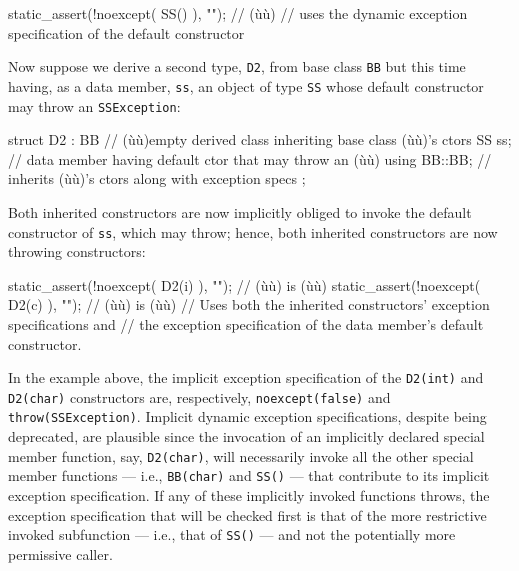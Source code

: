 \begin{emcppslisting}
static_assert(!noexcept( SS() ),  "");  // (ù{}ù)
    // uses the dynamic exception specification of the default constructor
\end{emcppslisting}
    

\noindent Now suppose we derive a second type, \lstinline!D2!, from base class
\lstinline!BB! but this time having, as a data member, \lstinline!ss!, an
object of type \lstinline!SS! whose default constructor may throw an
\lstinline!SSException!:

\begin{emcppslisting}
struct D2 : BB  // (ù{}ù)empty derived class inheriting base class (ù{}ù)'s ctors
{
    SS ss;         // data member having default ctor that may throw an (ù{}ù)
    using BB::BB;  // inherits (ù{}ù)'s ctors along with exception specs
};
\end{emcppslisting}
    

\noindent Both inherited constructors are now implicitly obliged to invoke the
default constructor of \lstinline!ss!, which may throw; hence, both
inherited constructors are now throwing constructors:

\begin{emcppslisting}
static_assert(!noexcept( D2(i) ), "");  // (ù{}ù) is (ù{}ù)
static_assert(!noexcept( D2(c) ), "");  // (ù{}ù) is (ù{}ù)
    // Uses both the inherited constructors' exception specifications and
    // the exception specification of the data member's default constructor.
\end{emcppslisting}
    

\noindent In the example above, the implicit exception specification of the
\lstinline!D2(int)! and \lstinline!D2(char)! constructors are, respectively,
\lstinline!noexcept(false)! and \lstinline!throw(SSException)!. Implicit
dynamic exception specifications, despite being deprecated, are
plausible since the invocation of an implicitly declared special member
function, say, \lstinline!D2(char)!, will necessarily invoke all the other
special member functions --- i.e., \lstinline!BB(char)! and \lstinline!SS()!
--- that contribute to its implicit exception specification. If any of
these implicitly invoked functions throws, the exception specification
that will be checked first is that of the more restrictive invoked
subfunction --- i.e., that of \lstinline!SS()! --- and not the potentially
more permissive caller.

